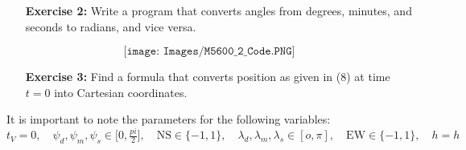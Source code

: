 \documentclass[11pt]{article}
\theoremstyle{definition}
\newcommand{\1}[1]{\mathbf{1} \left \{ #1 \right \}}
\begin{document}
\begin{itemize}
\item[{\textbf{Exercise 2:}}] Write a program that converts angles from degrees, minutes, and seconds to radians, and vice versa.
\end{itemize}
\[\texttt{[image: Images/M5600\_2\_Code.PNG]}\]

\begin{itemize}
\item[{\textbf{Exercise 3:}}] Find a formula that converts position as given in (8) at time $t = 0$ into Cartesian coordinates.
\end{itemize}
It is important to note the parameters for the following variables: \\
\(t_V = 0, \quad \psi_d, \psi_m, \psi_s \in \big[0, \frac{pi}{2}\big], \quad \textrm{NS} \in \{-1, 1\}, \quad \lambda_d, \lambda_m, \lambda_s \in [o, \pi], \quad \textrm{EW} \in \{-1, 1\}, \quad h = h\)
\end{document}
